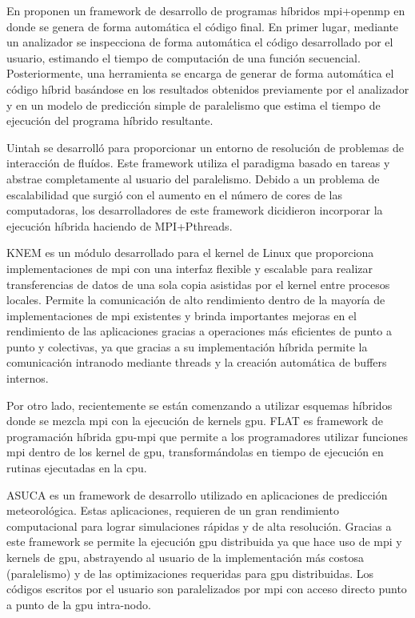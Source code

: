 En \cite{ompMPIcodeGeneration} proponen un framework de desarrollo de programas híbridos \acrshort{mpi}+\acrshort{openmp} en donde se genera de forma automática el código final. En primer lugar, mediante un analizador se inspecciona de forma automática el código desarrollado por el usuario, estimando el tiempo de computación de una función secuencial. Posteriormente, una herramienta se encarga de generar de forma automática el código híbrid basándose en los resultados obtenidos previamente por el analizador y en un modelo de predicción simple de paralelismo que estima el tiempo de ejecución del programa híbrido resultante.

Uintah \cite{Uintah} se desarrolló para proporcionar un entorno de resolución de problemas de interacción de fluídos. Este framework utiliza el paradigma basado en tareas y abstrae completamente al usuario del paralelismo. Debido a un problema de escalabilidad que surgió con el aumento en el número de cores de las computadoras, los desarrolladores de este framework dicidieron incorporar la ejecución híbrida haciendo de MPI+Pthreads.

KNEM \cite{knem} es un módulo desarrollado para el kernel de Linux que proporciona implementaciones de \acrshort{mpi} con una interfaz flexible y escalable para realizar transferencias de datos de una sola copia asistidas por el kernel entre procesos locales. Permite la comunicación de alto rendimiento dentro de la mayoría de implementaciones de \acrshort{mpi} existentes y brinda importantes mejoras en el rendimiento de las aplicaciones gracias a operaciones más eficientes de punto a punto y colectivas, ya que gracias a su implementación híbrida permite la comunicación intranodo mediante threads y la creación automática de buffers internos.

Por otro lado, recientemente se están comenzando a utilizar esquemas híbridos donde se mezcla \acrshort{mpi} con la ejecución de kernels \acrshort{gpu}. FLAT \cite{GPUMPI} es framework de programación híbrida \acrshort{gpu}-\acrshort{mpi} que permite a los programadores utilizar funciones \acrshort{mpi} dentro de los kernel de \acrshort{gpu}, transformándolas en tiempo de ejecución en rutinas ejecutadas en la \acrshort{cpu}. 

ASUCA \cite{ASUKA} es un framework de desarrollo utilizado en aplicaciones de predicción meteorológica. Estas aplicaciones, requieren de un gran rendimiento computacional para lograr simulaciones rápidas y de alta resolución. Gracias a este framework se permite la ejecución \acrshort{gpu} distribuida ya que hace uso de \acrshort{mpi} y kernels de \acrshort{gpu}, abstrayendo al usuario de la implementación más costosa (paralelismo) y de las optimizaciones requeridas para \acrshort{gpu} distribuidas. Los códigos escritos por el usuario son paralelizados por \acrshort{mpi} con acceso directo punto a punto de la \acrshort{gpu} intra-nodo.


